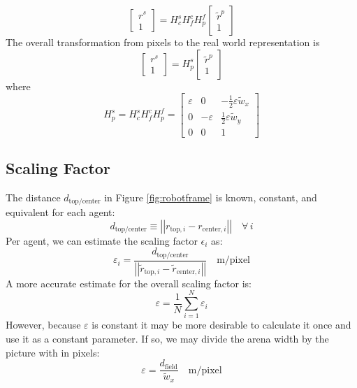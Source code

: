 \documentclass[12pt, a4paper]
{article}
\providecommand{\sub}[1]{_{\text{#1}}}
\providecommand{\subi}[1]{_{\text{#1},i}}
\providecommand{\twonorm}[1]{\left|\left|#1\right|\right|}
\providecommand{\foralli}{\quad \forall\, i}
\providecommand{\tr}{\tilde{r}}
\begin{document}
\begin{equation}
\begin{bmatrix}
r^s\\
1
\end{bmatrix} = H^s_c H^c_f H^f_p \begin{bmatrix}
\tr^p\\1
\end{bmatrix}
\end{equation}
%
The overall transformation from pixels to the real world representation is
%
\begin{equation}
\begin{bmatrix}
r^s\\
1
\end{bmatrix} = H^s_p \begin{bmatrix}
\tr^p\\1
\end{bmatrix}
\end{equation}
%
where
%
\begin{equation}
H^s_p =H^s_c H^c_f H^f_p = \begin{bmatrix}
 \varepsilon&    0& -\frac{1}{2}\varepsilon \tilde{w}_x\\
   0& -\varepsilon&  \frac{1}{2}\varepsilon \tilde{w}_y\\
0&    0&           1
\end{bmatrix}
\end{equation}



\subsection{Scaling Factor}
%
The distance $d\sub{top/center}$ in Figure \ref{fig:robotframe} is known, constant, and equivalent for each agent:
%
\begin{equation}
d\sub{top/center} \equiv \twonorm{r\subi{top}-r\subi{center}} \foralli
\end{equation}
%
Per agent, we can estimate the scaling factor $\epsilon_i$ as:
%
\begin{equation}
\varepsilon_i = \dfrac{d\sub{top/center}}{\twonorm{\tr\subi{top}-\tr\subi{center}}} \quad \text{m/pixel}
\end{equation}
%
A more accurate estimate for the overall scaling factor is:
%
\begin{equation}
\varepsilon = \dfrac{1}{N}\sum^N_{i=1} \varepsilon_i
\end{equation}
%
However, because $\varepsilon$ is constant it may be more desirable to calculate it once and use it as a constant parameter. If so, we may divide the arena width by the picture with in pixels:
%
\begin{equation}
\varepsilon = \dfrac{d\sub{field}}{\tilde{w}_x} \quad \text{m/pixel}
\end{equation}
\end{document}
